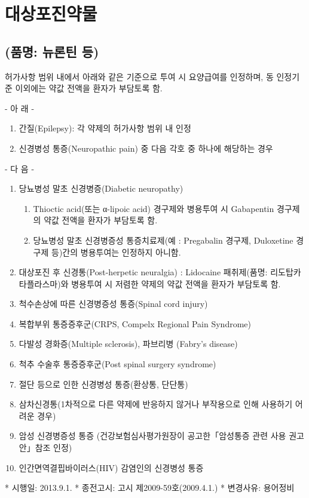 \section{대상포진약물}
\subsection{\label{GabepentinOral} (품명: 뉴론틴 등)}
허가사항 범위 내에서 아래와 같은 기준으로 투여 시 요양급여를 인정하며, 동 인정기준 이외에는 약값 전액을 환자가 부담토록 함.\par
- 아 래 -
\begin{enumerate}[1.]\tightlist
\item 간질(Epilepsy): 각 약제의 허가사항 범위 내 인정
\item 신경병성 통증(Neuropathic pain) 중 다음 각호 중 하나에 해당하는 경우
\end{enumerate}
- 다 음 -
\begin{enumerate}[가.]\tightlist
\item 당뇨병성 말초 신경병증(Diabetic neuropathy)
	\begin{enumerate}[1)]\tightlist
	\item  Thioctic acid(또는 α-lipoic acid) 경구제와 병용투여 시 Gabapentin 경구제의 약값 전액을 환자가 부담토록 함. 
	\item  당뇨병성 말초 신경병증성 통증치료제(예 : Pregabalin 경구제, Duloxetine 경구제 등)간의 병용투여는 인정하지 아니함.
	\end{enumerate}
\item 대상포진 후 신경통(Post-herpetic neuralgia) : Lidocaine 패취제(품명: 리도탑카타플라스마)와 병용투여 시 저렴한 약제의 약값 전액을 환자가 부담토록 함.
\item 척수손상에 따른 신경병증성 통증(Spinal cord injury)
\item 복합부위 통증증후군(CRPS, Compelx Regional Pain Syndrome)
\item 다발성 경화증(Multiple sclerosis), 파브리병 (Fabry's disease)
\item 척추 수술후 통증증후군(Post spinal surgery syndrome)
\item 절단 등으로 인한 신경병성 통증(환상통, 단단통)
\item 삼차신경통(1차적으로 다른 약제에 반응하지 않거나 부작용으로 인해 사용하기 어려운 경우)
\item 암성 신경병증성 통증 (건강보험심사평가원장이 공고한「암성통증 관련 사용 권고안」참조 인정)
\item 인간면역결핍바이러스(HIV) 감염인의 신경병성 통증
\end{enumerate}
* 시행일: 2013.9.1.
* 종전고시: 고시 제2009-59호(2009.4.1.)
* 변경사유: 용어정비

